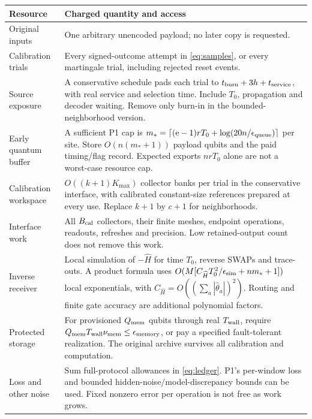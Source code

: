 \documentclass[11pt]{article}
\newcommand{\ee}{\mathrm e}
\begin{document}
\begin{longtable}{p{}p{}}
\toprule Resource & Charged quantity and access\\ \midrule\endhead
Original inputs & One arbitrary unencoded payload; no later copy is requested.\\
Calibration trials & Every signed-outcome attempt in \eqref{eq:samples},
or every martingale trial, including rejected reset events.\\
Source exposure & A conservative schedule pads each trial to
\(t_{\rm burn}+3h+t_{\rm service}\), with real service and selection time.
Include \(T_0\), propagation and decoder waiting. Remove only burn-in
in the bounded-neighborhood version.\\
Early quantum buffer & A sufficient P1 cap is
\(m_*=\lceil(\ee-1)rT_0+\log(20n/\epsilon_{\rm queue})\rceil\) per site.
Store \(O(n(m_*+1))\) payload qubits and the paid timing/flag record.
Expected exports \(nrT_0\) alone are not a worst-case resource cap.\\
Calibration workspace & \(O((k+1)K_{\max})\) collector banks per trial
in the conservative interface, with calibrated constant-size references
prepared at every use. Replace \(k+1\) by \(c+1\) for neighborhoods.\\
Interface work & All \(B_{\rm cal}\) collectors, their finite meshes,
endpoint operations, readouts, refreshes and precision.
Low retained-output count does not remove this work.\\
Inverse receiver & Local simulation of \(-\widehat H\) for time \(T_0\),
reverse SWAPs and trace-outs. A product formula uses
\(O(M[C_{\widehat H}T_0^2/\epsilon_{\rm sim}+nm_*+1])\)
local exponentials, with
\(C_{\widehat H}=O((\sum_a|\widehat\theta_a|)^2)\).
Routing and finite gate accuracy are additional polynomial factors.\\
Protected storage & For provisioned \(Q_{\rm mem}\) qubits through real
\(T_{\rm wall}\), require
\(Q_{\rm mem}T_{\rm wall}\nu_{\rm mem}\le\epsilon_{\rm memory}\),
or pay a specified fault-tolerant realization. The original archive
survives all calibration and computation.\\
Loss and other noise & Sum full-protocol allowances in \eqref{eq:ledger}.
P1's per-window loss and bounded hidden-noise/model-discrepancy bounds
can be used. Fixed nonzero error per operation is not free as work grows.\\
\bottomrule
\end{longtable}
\end{document}
